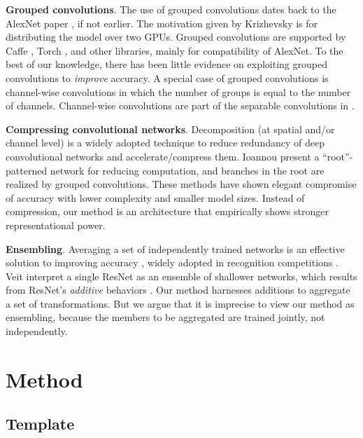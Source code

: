 \documentclass[10pt,twocolumn,letterpaper]{article}
\begin{document}
\vspace{.5em}
\noindent\textbf{Grouped convolutions}. The use of grouped convolutions dates back to the AlexNet paper \cite{Krizhevsky2012}, if not earlier. The motivation given by Krizhevsky \etal \cite{Krizhevsky2012} is for distributing the model over two GPUs. Grouped convolutions are supported by Caffe \cite{Jia2014}, Torch \cite{Collobert2002}, and other libraries, mainly for compatibility of AlexNet. To the best of our knowledge, there has been little evidence on exploiting grouped convolutions to \emph{improve} accuracy.
A special case of grouped convolutions is channel-wise convolutions in which the number of groups is equal to the number of channels. Channel-wise convolutions are part of the separable convolutions in \cite{Sifre2014}.

\vspace{.5em}
\noindent\textbf{Compressing convolutional networks}.
Decomposition (at spatial \cite{Denton2014,Jaderberg2014} and/or channel \cite{Denton2014,Kim2016,Ioannou2016} level) is a widely adopted technique to reduce redundancy of deep convolutional networks and accelerate/compress them. Ioannou \etal \cite{Ioannou2016} present a ``root''-patterned network for reducing computation, and branches in the root are realized by grouped convolutions. These methods \cite{Denton2014,Jaderberg2014,Kim2016,Ioannou2016} have shown elegant compromise of accuracy with lower complexity and smaller model sizes. Instead of compression, our method is an architecture that empirically shows stronger representational power.

\vspace{.5em}
\noindent\textbf{Ensembling}. 
Averaging a set of independently trained networks is an effective solution to improving accuracy \cite{Krizhevsky2012}, widely adopted in recognition competitions \cite{Russakovsky2015}. Veit \etal \cite{Veit2016} interpret a single ResNet as an ensemble of shallower networks, which results from ResNet's \emph{additive} behaviors \cite{He2016a}. Our method harnesses additions to aggregate a set of transformations. But we argue that it is imprecise to view our method as ensembling, because the members to be aggregated are trained jointly, not independently.

\section{Method}

\subsection{Template}
\label{sec:template}
\end{document}

